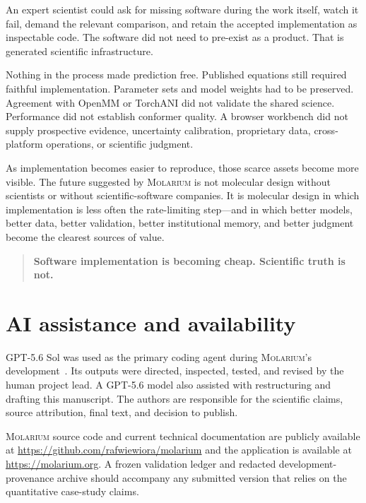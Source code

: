 \documentclass[11pt]{article}
\newcommand{\molarium}{\textnormal{\textsc{Molarium}}}
\begin{document}
An expert scientist could ask for missing software during the work itself, watch it fail, demand the relevant comparison, and retain the accepted implementation as inspectable code.
The software did not need to pre-exist as a product.
That is generated scientific infrastructure.

Nothing in the process made prediction free.
Published equations still required faithful implementation.
Parameter sets and model weights had to be preserved.
Agreement with OpenMM or TorchANI did not validate the shared science.
Performance did not establish conformer quality.
A browser workbench did not supply prospective evidence, uncertainty calibration, proprietary data, cross-platform operations, or scientific judgment.

As implementation becomes easier to reproduce, those scarce assets become more visible.
The future suggested by \molarium{} is not molecular design without scientists or without scientific-software companies.
It is molecular design in which implementation is less often the rate-limiting step---and in which better models, better data, better validation, better institutional memory, and better judgment become the clearest sources of value.

\begin{quote}
\centering
\textbf{Software implementation is becoming cheap. Scientific truth is not.}
\end{quote}

\section*{AI assistance and availability}

GPT-5.6 Sol was used as the primary coding agent during \molarium{}'s development~\cite{openai2026gpt56}.
Its outputs were directed, inspected, tested, and revised by the human project lead.
A GPT-5.6 model also assisted with restructuring and drafting this manuscript.
The authors are responsible for the scientific claims, source attribution, final text, and decision to publish.

\molarium{} source code and current technical documentation are publicly available at \url{https://github.com/rafwiewiora/molarium} and the application is available at \url{https://molarium.org}.
A frozen validation ledger and redacted development-provenance archive should accompany any submitted version that relies on the quantitative case-study claims.



\end{document}
